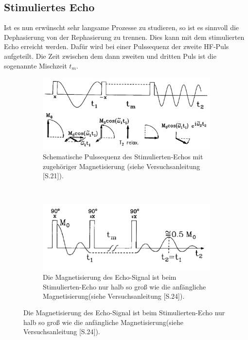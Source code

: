 \subsection{Stimuliertes Echo}
Ist es nun erw\"{u}nscht sehr langsame Prozesse zu studieren, so ist es sinnvoll die Dephasie{\-}rung von der Rephasierung zu trennen.
Dies kann mit dem stimulierten Echo erreicht werden.
Daf\"{u}r wird bei einer Pulssequenz der zweite HF-Puls aufgeteilt.
Die Zeit zwischen dem dann zweiten und dritten Puls ist die sogenannte Mischzeit $t_m$.
\begin{figure}
\centering
\caption{Stimuliertes-Echo.}
\vspace{+5pt}
	\begin{subfigure}[t]{0.4\textwidth}
		\includegraphics[width=\textwidth]{Plots/stimuliertesecho.png}
		\caption{Schematische Pulssequenz des Stimulierten-Echos mit zugeh\"{o}riger Magnetisierung (siehe Versuchsanleitung \cite{Anleitung}[S.21]).}
	\end{subfigure}
	~
	\begin{subfigure}[t]{0.4\textwidth}
		\includegraphics[width=\textwidth]{Plots/stimuliertesecho2.png}
		\caption{Die Magnetisierung des Echo-Signal ist beim Stimulierten-Echo nur halb so gro{\ss} wie die anf\"{a}ngliche Magnetisierung(siehe Versuchsanleitung \cite{Anleitung}[S.24]).}
	\end{subfigure}
\label{stimEcho.}
\end{figure}
